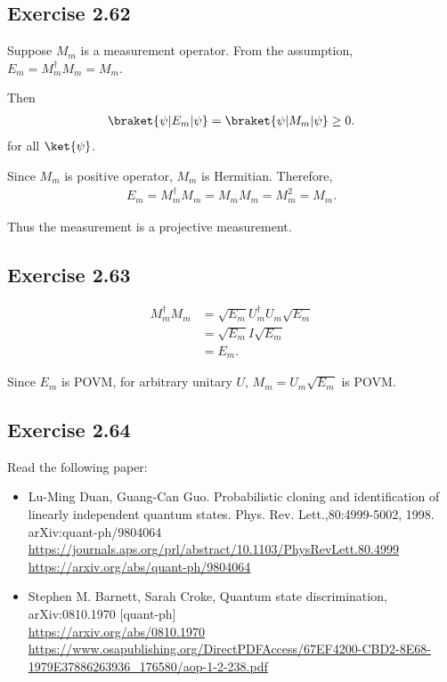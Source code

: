 \documentclass[a4paper,12pt]{article}
\begin{document}
\subsection*{Exercise 2.62}

Suppose $M_m$ is a measurement operator.
From the assumption, $E_m = M_m^\dagger M_m = M_m$.

Then
\begin{align*}
    \braket{\psi | E_m | \psi} = \braket{\psi | M_m | \psi} \geq 0.
\end{align*}
for all $\ket{\psi}$.

Since $M_m$ is positive operator, $M_m$ is Hermitian.
Therefore,
\begin{align*}
    E_m = M_m^\dagger M_m = M_m M_m = M_m^2 = M_m.
\end{align*}

Thus the measurement is a projective measurement.



\subsection*{Exercise 2.63}

\begin{align*}
    M_m^\dagger M_m &= \sqrt{E_m} U_m^\dagger U_m \sqrt{E_m}\\
        &= \sqrt{E_m} I \sqrt{E_m}\\
        &= E_m.
\end{align*}

Since $E_m$ is POVM,  for arbitrary  unitary $U$, $M_m=U_m\sqrt{E_m}$ is POVM.



\subsection*{Exercise 2.64}

Read the following paper:
\begin{itemize}
    \item Lu-Ming Duan, Guang-Can Guo.  Probabilistic cloning and identification of linearly independent quantum states. Phys. Rev. Lett.,80:4999-5002, 1998. arXiv:quant-ph/9804064\\
    \url{https://journals.aps.org/prl/abstract/10.1103/PhysRevLett.80.4999}\\
    \url{https://arxiv.org/abs/quant-ph/9804064}
%
    \item Stephen M. Barnett, Sarah Croke, Quantum state discrimination, arXiv:0810.1970 [quant-ph]\\
    \url{https://arxiv.org/abs/0810.1970}\\
    \url{https://www.osapublishing.org/DirectPDFAccess/67EF4200-CBD2-8E68-1979E37886263936_176580/aop-1-2-238.pdf}
\end{itemize}
\end{document}
